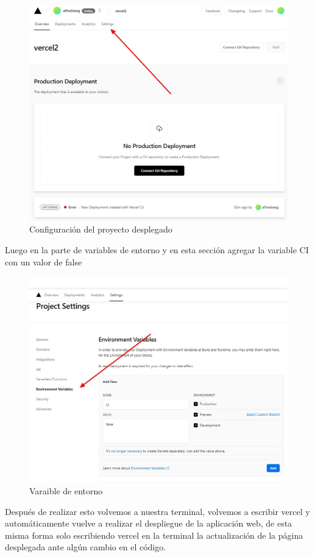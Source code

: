 \documentclass[12pt, a4paper, titlepage]{article}
\begin{document}
	\begin{figure}[H]
		\includegraphics[width=12cm]{./Imagenes/Despliegue/Ajustes.jpeg}
		\centering 
		\caption{Configuración del proyecto desplegado}
	\end{figure}
	Luego en la parte de variables de entorno y en esta sección agregar la variable CI con un valor de false
	\begin{figure}[H]
		\includegraphics[width=12cm]{./Imagenes/Despliegue/Varaiblesentorno.jpeg}
		\centering 
		\caption{Varaible de entorno}
	\end{figure}
	Después de realizar esto volvemos a nuestra terminal, volvemos a escribir vercel y automáticamente vuelve a realizar el despliegue de la aplicación web, de esta misma forma solo escribiendo vercel en la terminal la actualización de la página desplegada ante algún cambio en el código.\\\\
\end{document}
